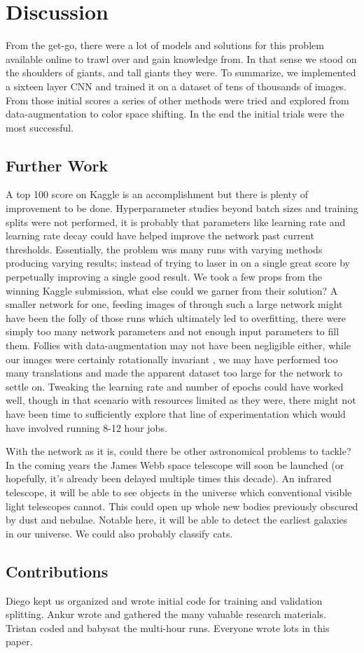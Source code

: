 \section{Discussion}

From the get-go, there were a lot of models and solutions for this problem available online to trawl over and gain knowledge from. In that sense we stood on the shoulders of giants, and tall giants they were. To summarize, we implemented a sixteen layer CNN and trained it on a dataset of tens of thousands of images. From those initial scores a series of other methods were tried and explored from data-augmentation to color space shifting. In the end the initial trials were the most successful. 

\subsection{Further Work}
A top 100 score on Kaggle is an accomplishment but there is plenty of improvement to be done. Hyperparameter studies beyond batch sizes and training splits were not performed, it is probably that parameters like learning rate and learning rate decay could have helped improve the network past current thresholds. Essentially, the problem was many runs with varying methods producing varying results; instead of trying to laser in on a single great score by perpetually improving a single good result. We took a few props from the winning Kaggle submission, what else could we garner from their solution? A smaller network for one, feeding images of  through such a large network might have been the folly of those runs which ultimately led to overfitting, there were simply too many network parameters and not enough input parameters to fill them. Follies with data-augmentation may not have been negligible either, while our images were certainly rotationally invariant , we may have performed too many translations and made the apparent dataset too large for the network to settle on. Tweaking the learning rate and number of epochs could have worked well, though in that scenario with resources limited as they were, there might not have been time to sufficiently explore that line of experimentation which would have involved running 8-12 hour jobs.

With the network as it is, could there be other astronomical problems to tackle? In the coming years the James Webb space telescope will soon be launched (or hopefully, it's already been delayed multiple times this decade). An infrared telescope, it will be able to see objects in the universe which conventional visible light telescopes cannot. This could open up whole new bodies previously obscured by dust and nebulae. Notable here, it will be able to detect the earliest galaxies in our universe. We could also probably classify cats.

\subsection{Contributions}
Diego kept us organized and wrote initial code for training and validation splitting. Ankur wrote and gathered the many valuable research materials.
Tristan coded and babysat the multi-hour runs. Everyone wrote lots in this paper.